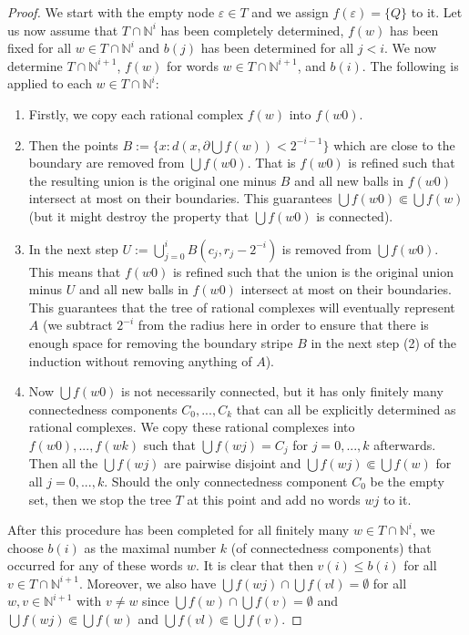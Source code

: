 \documentclass[a4paper]{amsart}
\def\IN{{\mathbb{N}}}
\theoremstyle{definition}
\begin{document}
\begin{proof}
We start with the empty node $\varepsilon\in T$ and we assign $f(\varepsilon)=\{Q\}$ to it.
Let us now assume that $T\cap\IN^i$ has been completely determined, $f(w)$ has been fixed for all $w\in T\cap\IN^i$
and $b(j)$ has been determined for all $j<i$. We now determine $T\cap\IN^{i+1}$, $f(w)$ for words $w\in T\cap\IN^{i+1}$,
and $b(i)$. The following is applied to each $w\in T\cap\IN^i$:
\begin{enumerate}
\item Firstly, we copy each rational complex $f(w)$ into $f(w0)$.
\item Then the points $B:=\{x:d(x,\partial\bigcup f(w))<2^{-i-1}\}$ which are close to the boundary are removed from $\bigcup f(w0)$.
         That is $f(w0)$ is refined such that the resulting union is the original one minus $B$ and all new balls in $f(w0)$ intersect at most on their boundaries.
        This guarantees $\bigcup f(w0)\Subset\bigcup f(w)$ (but it might destroy the property that $\bigcup f(w0)$ is connected).
\item In the next step $U:=\bigcup_{j=0}^i B(c_j,r_j-2^{-i})$ is removed from $\bigcup f(w0)$. This means that $f(w0)$ is refined
        such that the union is the original union minus $U$ and all new balls in $f(w0)$ intersect at most on their boundaries.
        This guarantees that the tree of rational complexes will eventually represent $A$ (we subtract $2^{-i}$ from the radius here in order to ensure
        that there is enough space for removing the boundary stripe $B$ in the next step (2) of the induction without removing anything of $A$).
\item Now $\bigcup f(w0)$ is not necessarily connected, but it has only finitely many connectedness components $C_0,...,C_k$
        that can all be explicitly determined as rational complexes. We copy these rational complexes into $f(w0),...,f(wk)$
        such that $\bigcup f(wj)=C_j$ for $j=0,...,k$ afterwards.
        Then all the $\bigcup f(wj)$ are pairwise disjoint and $\bigcup f(wj)\Subset\bigcup f(w)$ for all $j=0,...,k$.
        Should the only connectedness component $C_0$ be the empty set, then we stop the tree $T$ at this point and add no words $wj$ to it.
\end{enumerate}
After this procedure has been completed for all finitely many $w\in T\cap\IN^i$, we choose $b(i)$ as the maximal number
$k$ (of connectedness components) that occurred for any of these words $w$. It is clear that then $v(i)\leq b(i)$ for all $v\in T\cap\IN^{i+1}$. 
Moreover, we also have $\bigcup f(wj)\cap\bigcup f(vl)=\emptyset$ for all $w,v\in\IN^{i+1}$ with $v\not=w$ since 
$\bigcup f(w)\cap\bigcup f(v)=\emptyset$ and $\bigcup f(wj)\Subset\bigcup f(w)$ and $\bigcup f(vl)\Subset\bigcup f(v)$.


\end{proof}
\end{document}
